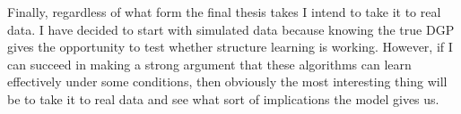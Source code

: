 \documentclass{article}
\begin{document}
Finally, regardless of what form the final thesis takes I intend to take it to real data. I have decided to start with simulated data because knowing the true DGP gives the opportunity to test whether structure learning is working. However, if I can succeed in making a strong argument that these algorithms can learn effectively under some conditions, then obviously the most interesting thing will be to take it to real data and see what sort of implications the model gives us.  

\printbibliography
\end{document}
